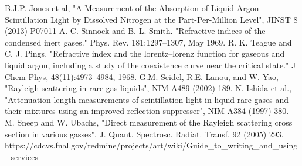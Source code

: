 \documentclass[12pt]{elsarticle}
\begin{document}
\begin{thebibliography}{99}
 B.J.P. Jones et al, "A Measurement of the Absorption of Liquid Argon Scintillation Light by Dissolved Nitrogen at the Part-Per-Million Level", JINST 8 (2013) P07011
 A. C. Sinnock and B. L. Smith. "Refractive indices of the condensed inert gases." Phys. Rev. 181:1297–1307, May 1969.   R. K. Teague and C. J. Pings. "Refractive index and the lorentz–lorenz function for gaseous and liquid argon, including a study of the coexistence curve near the critical state." J Chem Phys, 48(11):4973–4984, 1968.
 G.M. Seidel, R.E. Lanou, and W. Yao, "Rayleigh scattering in rare-gas liquids", NIM A489 (2002) 189.   N. Ishida et al., "Attenuation length measurements of scintillation light in liquid rare gases and their mixtures using an improved reflection suppresser", NIM A384 (1997) 380. M. Sneep and W. Ubachs, "Direct measurement of the Rayleigh scattering cross section in various gasses", J. Quant. Spectrosc. Radiat. Transf. 92 (2005) 293.
 https://cdcvs.fnal.gov/redmine/projects/art/wiki/Guide\_to\_writing\_and\_using\_services
\end{thebibliography}
\clearpage 
\end{document}
